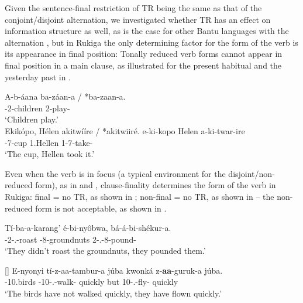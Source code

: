 \documentclass[output=paper]{langscibook}
\begin{document}
Given the sentence-final restriction of TR being the same as that of the conjoint/disjoint alternation, we investigated whether TR has an effect on information structure as well, as is the case for other Bantu languages with the alternation \citep{vanderWal2017}, but in Rukiga the only determining factor for the form of the verb is its appearance in final position: Tonally reduced verb forms cannot appear in final position in a main clause, as illustrated for the present habitual and the yesterday past in . 

\ea
\label{bkm:Ref99002375}
\ea
\gll
A-b-áana  ba-záan-a / *ba-zaan-a.    \\
\AUG{}-2{}-children  2\SM{}-play-\FV{}\\ 
\glt
‘Children play.’\\

\ex
Ekikópo, Hélen akitwííre / *akitwiiré.  
\gll
e-ki-kopo  Helen  a-ki-twar-ire\\
\AUG{}-7-cup  1.Hellen  1\SM{}-7\OM{}-take-\PFV{}\\
\glt
‘The cup, Hellen took it.’\\
 \citep[48]{vanderWalAsiimwe2020}

\z
\z


Even when the verb is in focus (a typical environment for the disjoint/non-reduced form), as in  and , clause-finality determines the form of the verb in Rukiga: final = no TR, as shown in ; non-final = no TR, as shown in  – the non-reduced form is not acceptable, as shown in .

\ea
\label{bkm:Ref99002467}
\gll
Tí-ba-a-karang’  é-bi-nyôbwa,  bá-á-bi-shékur-a.\\
\NEG{}-2\SM{}-\N{}.\PST{}-roast  \AUG{}-8-groundnuts  2\SM{}-\N{}.\PST{}-8\OM{}-pound-\FV{}\\
\glt
‘They didn’t roast the groundnuts, they pounded them.’\\
\citep[51]{vanderWalAsiimwe2020}

\z

\ea
\label{bkm:Ref99002400}
\ea
\label{bkm:Ref99002400:a}
\begin{xlist}[TR]
[]{
\gll
E-nyonyi  tí-z-aa-tambur-a  júba  kwonká  z-\textbf{aa}-guruk-a  júba.\\
\AUG{}-10.birds  \NEG{}-10\SM{}-\N{}.\PST{}-walk-\FV{}  quickly  but  10\SM{}-\N{}.\PST{}-fly-\FV{}  quickly\\
\glt
‘The birds have not walked quickly, they have flown quickly.’\\
}
\end{xlist}
\end{document}
